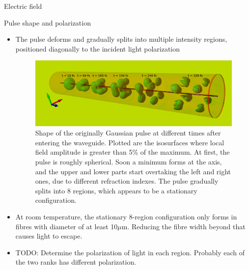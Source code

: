 \documentclass[8pt]{beamer}
\newlength{\wideitemsep}
\let\olditem\item
\renewcommand{\item}{\setlength{\itemsep}{\wideitemsep}\olditem}
\newcommand{\blockpadding}{
  \rule[-0.6ex]{0pt}{2.5ex}
}
\begin{document}
\begin{columns}[t]
\begin{column}{0.596\textwidth}
\begin{block}{\blockpadding Electric field}
\end{block}
\begin{block}{\blockpadding Pulse shape and polarization}
\begin{itemize}
\item The pulse deforms and gradually splits into multiple intensity regions, positioned diagonally to the incident light polarization
\vspace{.3ex}
 \begin{figure}[h]
  \centering
  \includegraphics[width=.825\textwidth]{./intensity_gauss_t}
  \caption{Shape of the originally Gaussian pulse at different times after entering the waveguide. Plotted are the isosurfaces where local field amplitude is greater than 5\% of the maximum. At first, the pulse is roughly spherical. Soon a minimum forms at the axis, and the upper and lower parts start overtaking the left and right ones, due to different refraction indexes. The pulse gradually splits into 8 regions, which appears to be a stationary configuration. }
 \end{figure}

 \item At room temperature, the stationary 8-region configuration only forms in fibres with diameter of at least 10$\mu$m. Reducing the fibre width beyond that causes light to escape. 
 \item TODO: Determine the polarization of light in each region. Probably each of the two ranks has different polarization. 
\end{itemize}


\end{block}


\end{column}
\end{columns}
\end{document}
